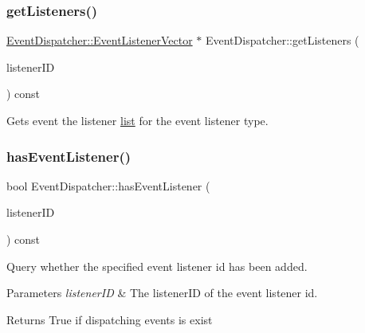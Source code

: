 \subsubsection{\texorpdfstring{get\+Listeners()}{getListeners()}\hspace{0.1cm}{\footnotesize\ttfamily [2/2]}}
{\footnotesize\ttfamily \hyperlink{classEventDispatcher_1_1EventListenerVector}{Event\+Dispatcher\+::\+Event\+Listener\+Vector} $\ast$ Event\+Dispatcher\+::get\+Listeners (\begin{DoxyParamCaption}\item[{const Event\+Listener\+::\+Listener\+ID \&}]{listener\+ID }\end{DoxyParamCaption}) const\hspace{0.3cm}{\ttfamily [protected]}}

Gets event the listener \hyperlink{protocollist-p}{list} for the event listener type. \mbox{\label{classEventDispatcher_a22e17868087e7162f7d59559f2122308}} 
\subsubsection{\texorpdfstring{has\+Event\+Listener()}{hasEventListener()}}
{\footnotesize\ttfamily bool Event\+Dispatcher\+::has\+Event\+Listener (\begin{DoxyParamCaption}\item[{const Event\+Listener\+::\+Listener\+ID \&}]{listener\+ID }\end{DoxyParamCaption}) const}

Query whether the specified event listener id has been added.


\begin{DoxyParams}{Parameters}
{\em listener\+ID} & The listener\+ID of the event listener id.\\
\hline
\end{DoxyParams}
\begin{DoxyReturn}{Returns}
True if dispatching events is exist 
\end{DoxyReturn}
\mbox{\label{classEventDispatcher_a5350c4316fd57701602cb7d9f5fb8535}} 
